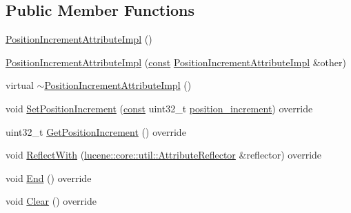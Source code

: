 \subsection*{Public Member Functions}
\begin{DoxyCompactItemize}
\item 
\mbox{\hyperlink{classlucene_1_1core_1_1analysis_1_1tokenattributes_1_1PositionIncrementAttributeImpl_a3a4d29b631b20b0826e06515a76c7a57}{Position\+Increment\+Attribute\+Impl}} ()
\item 
\mbox{\hyperlink{classlucene_1_1core_1_1analysis_1_1tokenattributes_1_1PositionIncrementAttributeImpl_a1982fd1c9538ad47213965386e7d7566}{Position\+Increment\+Attribute\+Impl}} (\mbox{\hyperlink{ZlibCrc32_8h_a2c212835823e3c54a8ab6d95c652660e}{const}} \mbox{\hyperlink{classlucene_1_1core_1_1analysis_1_1tokenattributes_1_1PositionIncrementAttributeImpl}{Position\+Increment\+Attribute\+Impl}} \&other)
\item 
virtual \mbox{\hyperlink{classlucene_1_1core_1_1analysis_1_1tokenattributes_1_1PositionIncrementAttributeImpl_a7a7ac9ea7c224e4f2a62e4b199cddde9}{$\sim$\+Position\+Increment\+Attribute\+Impl}} ()
\item 
void \mbox{\hyperlink{classlucene_1_1core_1_1analysis_1_1tokenattributes_1_1PositionIncrementAttributeImpl_a7e1d05c2dab9f80a43df0def33f71c27}{Set\+Position\+Increment}} (\mbox{\hyperlink{ZlibCrc32_8h_a2c212835823e3c54a8ab6d95c652660e}{const}} uint32\+\_\+t \mbox{\hyperlink{classlucene_1_1core_1_1analysis_1_1tokenattributes_1_1PositionIncrementAttributeImpl_a3de757124d0bf5a9395e8c943c4ee5cf}{position\+\_\+increment}}) override
\item 
uint32\+\_\+t \mbox{\hyperlink{classlucene_1_1core_1_1analysis_1_1tokenattributes_1_1PositionIncrementAttributeImpl_aed9c6939240be709472fff07ea8f7059}{Get\+Position\+Increment}} () override
\item 
void \mbox{\hyperlink{classlucene_1_1core_1_1analysis_1_1tokenattributes_1_1PositionIncrementAttributeImpl_a2ede3f15304f9760ad60009335123ece}{Reflect\+With}} (\mbox{\hyperlink{namespacelucene_1_1core_1_1util_a7dbb701adaed055f73fb95eec83da10a}{lucene\+::core\+::util\+::\+Attribute\+Reflector}} \&reflector) override
\item 
void \mbox{\hyperlink{classlucene_1_1core_1_1analysis_1_1tokenattributes_1_1PositionIncrementAttributeImpl_adb934ddcbf6f584c50a72c0980b88761}{End}} () override
\item 
void \mbox{\hyperlink{classlucene_1_1core_1_1analysis_1_1tokenattributes_1_1PositionIncrementAttributeImpl_a49cd1a34361a145c3b674f1f3d529641}{Clear}} () override

\end{DoxyCompactItemize}
